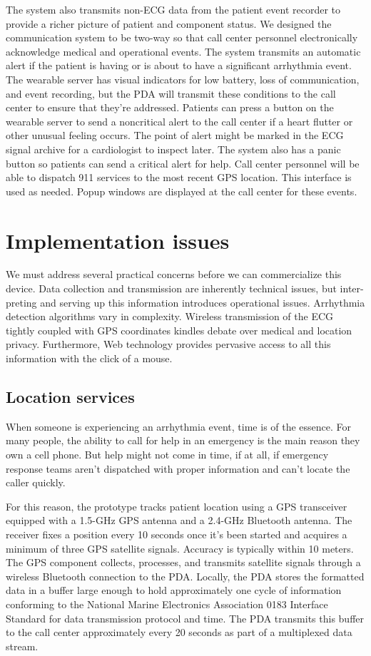 \documentclass[a4paper,12pt]{article}
\begin{document}
The system also transmits non-ECG data from the patient event recorder to provide a richer picture of patient and component status. We designed the communication system to be two-way so that call center personnel electronically acknowledge medical and operational events. The system transmits an automatic alert if the patient is having or is about to have a significant arrhythmia event. The wearable server has visual indicators for low battery, loss of communication, and event recording, but the PDA will transmit these conditions to the call center to ensure that they’re addressed. Patients can press a button on the wearable server to send a noncritical alert to the call center if a heart flutter or other unusual feeling occurs. The point of alert might be marked in the ECG signal archive for a cardiologist to inspect later. The system also has a panic button so patients can send a critical alert for help. Call center personnel will be able to dispatch 911 services to the most recent GPS location. This interface is used as needed. Popup windows are displayed at the call center for these events.

\section{Implementation issues}


We must address several practical concerns before we can commercialize this device. Data collection and transmission are inherently technical issues, but inter- preting and serving up this information introduces operational issues. Arrhythmia detection algorithms vary in complexity. Wireless transmission of the ECG tightly coupled with GPS coordinates kindles debate over medical and location privacy. Furthermore, Web technology provides pervasive access to all this information with the click of a mouse.

\subsection{Location services}


When someone is experiencing an arrhythmia event, time is of the essence. For many people, the ability to call for help in an emergency is the main reason they own a cell phone. But help might not come in time, if at all, if emergency response teams aren’t dispatched with proper information and can’t locate the caller quickly.

For this reason, the prototype tracks patient location using a GPS transceiver equipped with a 1.5-GHz GPS antenna and a 2.4-GHz Bluetooth antenna. The receiver fixes a position every 10 seconds once it’s been started and acquires a minimum of three GPS satellite signals. Accuracy is typically within 10 meters. The GPS component collects, processes, and transmits satellite signals through a wireless Bluetooth connection to the PDA. Locally, the PDA stores the formatted data in a buffer large enough to hold approximately one cycle of information conforming to the National Marine Electronics Association 0183 Interface Standard for data transmission protocol and time. The PDA transmits this buffer to the call center approximately every 20 seconds as part of a multiplexed data stream.
\end{document}
